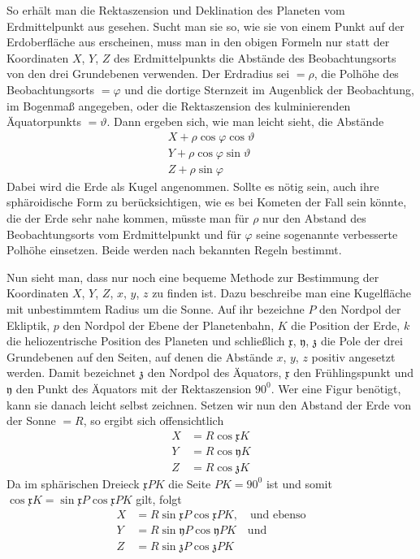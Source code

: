 So erhält man die Rektaszension und Deklination des Planeten vom Erdmittelpunkt
aus gesehen. Sucht man sie so, wie sie von einem Punkt auf der Erdoberfläche aus
erscheinen, muss man in den obigen Formeln nur statt der Koordinaten $X$, $Y$, $Z$
des Erdmittelpunkts die Abstände des Beobachtungsorts von den drei Grundebenen
verwenden. Der Erdradius sei $=\rho$, die Polhöhe des Beobachtungsorts
$=\varphi$ und die dortige Sternzeit im Augenblick der Beobachtung, im Bogenmaß
angegeben, oder die Rektaszension des kulminierenden Äquatorpunkts $=\vartheta$.
Dann ergeben sich, wie man leicht sieht, die Abstände
\[
\begin{gathered}
X+\rho\cos\varphi\cos\vartheta\\
Y+\rho\cos\varphi\sin\vartheta\\
Z+\rho\sin\varphi
\end{gathered}
\]
Dabei wird die Erde als Kugel angenommen. Sollte es nötig sein, auch ihre
sphäroidische Form zu berücksichtigen, wie es bei Kometen der Fall sein könnte,
die der Erde sehr nahe kommen, müsste man für $\rho$ nur den Abstand des
Beobachtungsorts vom Erdmittelpunkt und für $\varphi$ seine sogenannte
verbesserte Polhöhe einsetzen. Beide werden nach bekannten Regeln bestimmt.

Nun sieht man, dass nur noch eine bequeme Methode zur Bestimmung der Koordinaten
$X$, $Y$, $Z$, $x$, $y$, $z$ zu finden ist. Dazu beschreibe man eine Kugelfläche
mit unbestimmtem Radius um die Sonne. Auf ihr bezeichne $P$ den Nordpol der
Ekliptik, $p$ den Nordpol der Ebene der Planetenbahn, $K$ die Position der Erde,
$k$ die heliozentrische Position des Planeten und schließlich $\mathfrak{x}$,
$\mathfrak{y}$, $\mathfrak{z}$ die Pole der drei Grundebenen auf den Seiten, auf
denen die Abstände $x$, $y$, $z$ positiv angesetzt werden.
%
Damit bezeichnet $\mathfrak{z}$ den Nordpol des Äquators, $\mathfrak{x}$ den
Frühlingspunkt und $\mathfrak{y}$ den Punkt des Äquators mit der Rektaszension
$90^0$. Wer eine Figur benötigt, kann sie danach leicht selbst zeichnen. Setzen
wir nun den Abstand der Erde von der Sonne $=R$, so ergibt sich offensichtlich
\[
\begin{aligned}
X&=R\cos\mathfrak{x}K\\
Y&=R\cos\mathfrak{y}K\\
Z&=R\cos\mathfrak{z}K
\end{aligned}
\]
Da im sphärischen Dreieck $\mathfrak{x}PK$ die Seite $PK=90^0$ ist und somit
$\cos\mathfrak{x}K=\sin\mathfrak{x}P\cos\mathfrak{x}PK$ gilt, folgt
\[
\begin{aligned}
X&=R\sin\mathfrak{x}P\cos\mathfrak{x}PK,\quad\text{und ebenso}\\
Y&=R\sin\mathfrak{y}P\cos\mathfrak{y}PK\quad\text{und}\\
Z&=R\sin\mathfrak{z}P\cos\mathfrak{z}PK
\end{aligned}
\]

